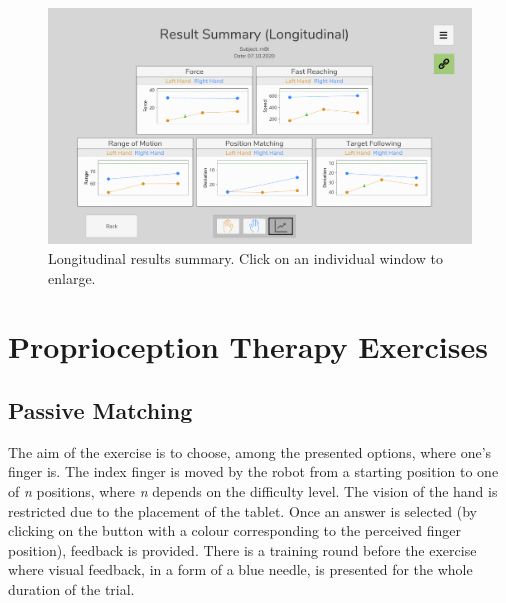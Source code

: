 \documentclass[10pt,oneside,a4paper]{article}
\begin{document}
\begin{figure}[h!]
\begin{center}
\includegraphics[width=\columnwidth]{images/Assessments/LongitudinalResults.png}
\caption{Longitudinal results summary. Click on an individual window to enlarge.}
\label{fig:LongitudinalResults}
\end{center}
\end{figure}

\newpage

\section{Proprioception Therapy Exercises}
\subsection{Passive Matching}
The aim of the exercise is to choose, among the presented options, where one’s finger is. The index finger is moved by the robot from a starting position to one of \emph{n} positions, where \emph{n} depends on the difficulty level. The vision of the hand is restricted due to the placement of the tablet. Once an answer is selected (by clicking on the button with a colour corresponding to the perceived finger position), feedback is provided. There is a training round before the exercise where visual feedback, in a form of a blue needle, is presented for the whole duration of the trial.
\end{document}
